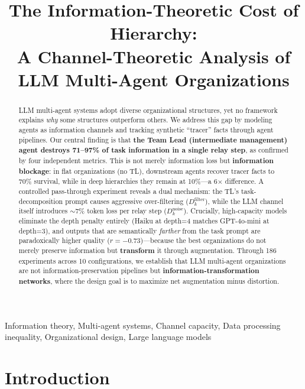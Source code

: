 \documentclass[conference]{IEEEtran}
\begin{document}
\title{The Information-Theoretic Cost of Hierarchy:\\
A Channel-Theoretic Analysis of LLM Multi-Agent Organizations}

\author{
\IEEEauthorblockA{
}
}

\maketitle

\begin{abstract}
LLM multi-agent systems adopt diverse organizational structures, yet no framework explains \emph{why} some structures outperform others.
We address this gap by modeling agents as information channels and tracking synthetic ``tracer'' facts through agent pipelines.
Our central finding is that \textbf{the Team Lead (intermediate management) agent destroys 71--97\% of task information in a single relay step}, as confirmed by four independent metrics.
This is not merely information loss but \textbf{information blockage}: in flat organizations (no TL), downstream agents recover tracer facts to 70\% survival, while in deep hierarchies they remain at 10\%---a 6$\times$ difference.
A controlled pass-through experiment reveals a dual mechanism: the TL's task-decomposition prompt causes aggressive over-filtering ($D_k^{\text{filter}}$), while the LLM channel itself introduces $\sim$7\% token loss per relay step ($D_k^{\text{noise}}$).
Crucially, high-capacity models eliminate the depth penalty entirely (Haiku at depth=4 matches GPT-4o-mini at depth=3), and outputs that are semantically \emph{farther} from the task prompt are paradoxically higher quality ($r = -0.73$)---because the best organizations do not merely preserve information but \textbf{transform} it through augmentation.
Through 186 experiments across 10 configurations, we establish that LLM multi-agent organizations are not information-preservation pipelines but \textbf{information-transformation networks}, where the design goal is to maximize net augmentation minus distortion.
\end{abstract}

\begin{IEEEkeywords}
Information theory, Multi-agent systems, Channel capacity, Data processing inequality, Organizational design, Large language models
\end{IEEEkeywords}

\section{Introduction}
\label{sec:intro}
\end{document}
